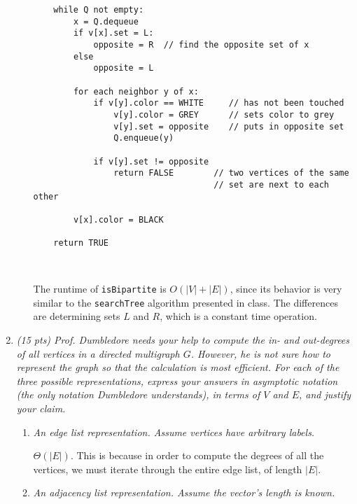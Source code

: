 \documentclass[12pt]{article}
\begin{document}
\begin{enumerate}
\begin{enumerate}
\begin{small}
\begin{verbatim}
    while Q not empty:
        x = Q.dequeue
        if v[x].set = L:
            opposite = R  // find the opposite set of x
        else 
            opposite = L
        
        for each neighbor y of x:
            if v[y].color == WHITE     // has not been touched
                v[y].color = GREY      // sets color to grey
                v[y].set = opposite    // puts in opposite set
                Q.enqueue(y)
                
            if v[y].set != opposite
                return FALSE        // two vertices of the same
                                    // set are next to each other
                                    
        v[x].color = BLACK
        
    return TRUE
                
        
            \end{verbatim}
            \end{small}
            
            The runtime of {\tt isBipartite} is $O(|V| + |E|)$, since its behavior is very similar to the {\tt searchTree} algorithm presented in class. The differences are determining sets $L$ and $R$, which is a constant time operation.
            
    \end{enumerate}
    
    \newpage
    \item \textit{(15 pts) Prof. Dumbledore needs your help to compute the in- and out-degrees of all vertices in a directed multigraph $G$. However, he is not sure how to represent the graph so that the calculation is most efficient. For each of the three possible representations, express your answers in asymptotic notation (the only notation Dumbledore understands), in terms of $V$ and $E$, and justify your claim.}
    \begin{enumerate}
         \item \textit{An edge list representation. Assume vertices have arbitrary labels.}
         
         $\Theta(|E|)$. This is because in order to compute the degrees of all the vertices, we must iterate through the entire edge list, of length $|E|$.\\
         
         \item \textit{An adjacency list representation. Assume the vector’s length is known.}
         

\end{enumerate}
\end{enumerate}
\end{document}
